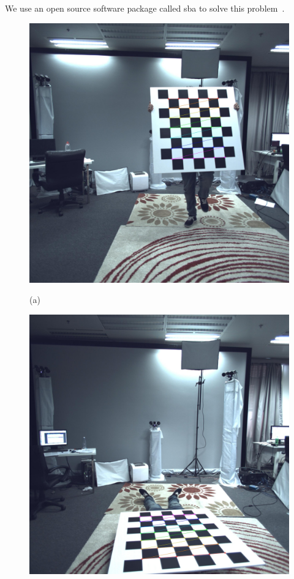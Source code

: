 \documentclass{article}
\begin{document}
We use an open source software package called sba to solve this problem~\cite{lour09}.


\begin{figure}[ht]
%
\begin{minipage}[b]{.48\linewidth}
  \centering
\includegraphics[scale=0.058]{image/free.jpg}
  \vspace{0cm}
  \centerline{(a)}\medskip
\end{minipage}
\hfill
\begin{minipage}[b]{0.48\linewidth}
  \centering
\includegraphics[scale=0.058]{image/ground.jpg}

\end{minipage}
\end{figure}
\end{document}
